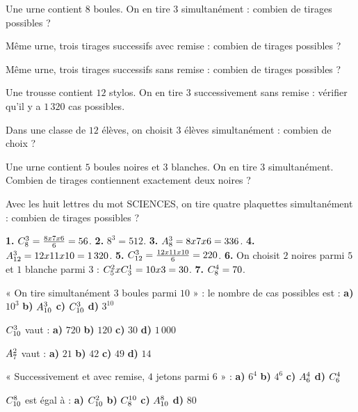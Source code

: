 \begin{entrainement}[compter]
\exo[\niveau{1}] Une urne contient $8$ boules. On en tire $3$
simultanément : combien de tirages possibles ?

\exo[\niveau{1}] Même urne, trois tirages successifs avec remise : combien
de tirages possibles ?

\exo[\niveau{2}] Même urne, trois tirages successifs sans remise : combien
de tirages possibles ?

\exo[\niveau{2}] Une trousse contient $12$ stylos. On en tire $3$
successivement sans remise : vérifier qu'il y a $1\,320$ cas possibles.

\exo[\niveau{2}] Dans une classe de $12$ élèves, on choisit $3$ élèves
simultanément : combien de choix ?

\exo[\niveau{3}] Une urne contient $5$ boules noires et $3$ blanches. On en
tire $3$ simultanément. Combien de tirages contiennent exactement deux
noires ?

\exo[\niveau{3}] Avec les huit lettres du mot SCIENCES, on tire quatre
plaquettes simultanément : combien de tirages possibles ?
\end{entrainement}

\begin{corrige}[compter]
\textbf{1.} $\combi{3}{8} = \frac{8\times7\times6}{6} = 56$.
\textbf{2.} $8^{3} = 512$.
\textbf{3.} $\arrang{3}{8} = 8\times7\times6 = 336$.
\textbf{4.} $\arrang{3}{12} = 12\times11\times10 = 1\,320$. \checkmark
\textbf{5.} $\combi{3}{12} = \frac{12\times11\times10}{6} = 220$.
\textbf{6.} On choisit $2$ noires parmi $5$ et $1$ blanche parmi $3$ :
$\combi{2}{5}\times\combi{1}{3} = 10\times3 = 30$.
\textbf{7.} $\combi{4}{8} = 70$.
\end{corrige}

\begin{qcm}
\exo « On tire simultanément $3$ boules parmi $10$ » : le nombre de cas
possibles est :
\textbf{a)} $10^{3}$ \quad \textbf{b)} $\arrang{3}{10}$ \quad
\textbf{c)} $\combi{3}{10}$ \quad \textbf{d)} $3^{10}$ 

\exo $\combi{3}{10}$ vaut :
\textbf{a)} $720$ \quad \textbf{b)} $120$ \quad \textbf{c)} $30$ \quad
\textbf{d)} $1\,000$ 

\exo $\arrang{2}{7}$ vaut :
\textbf{a)} $21$ \quad \textbf{b)} $42$ \quad \textbf{c)} $49$ \quad
\textbf{d)} $14$ 

\exo « Successivement et avec remise, $4$ jetons parmi $6$ » :
\textbf{a)} $6^{4}$ \quad \textbf{b)} $4^{6}$ \quad
\textbf{c)} $\arrang{4}{6}$ \quad \textbf{d)} $\combi{4}{6}$

\exo $\combi{8}{10}$ est égal à :
\textbf{a)} $\combi{2}{10}$ \quad \textbf{b)} $\combi{10}{8}$ \quad
\textbf{c)} $\arrang{8}{10}$ \quad \textbf{d)} $80$ 
\end{qcm}

